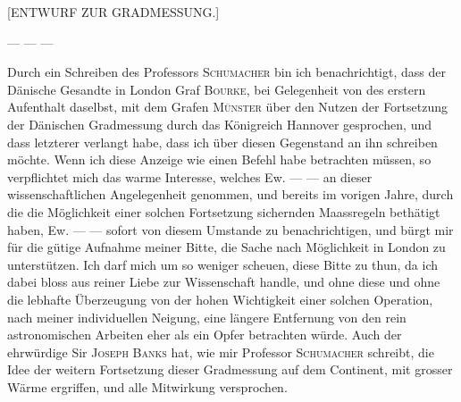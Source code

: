 \par\bigskip
{}%
\begin{center}\large [ENTWURF ZUR GRADMESSUNG.]\end{center}
\par
— — —

Durch ein Schreiben des Professors \textsc{Schumacher} bin ich benachrichtigt, dass der Dänische Gesandte in London Graf \textsc{Bourke}, bei Gelegenheit von des erstern Aufenthalt daselbst, mit dem Grafen \textsc{Münster} über den Nutzen der Fortsetzung der Dänischen Gradmessung durch das Königreich Hannover gesprochen, und dass letzterer verlangt habe, dass ich über diesen Gegenstand an ihn schreiben möchte. Wenn ich diese Anzeige wie einen Befehl habe betrachten müssen, so verpflichtet mich das warme Interesse, welches Ew. — — an dieser wissenschaftlichen Angelegenheit genommen, und bereits im vorigen Jahre, durch die die Möglichkeit einer solchen Fortsetzung sichernden Maassregeln bethätigt haben, Ew. — — sofort von diesem Umstande zu benachrichtigen, und bürgt mir für die gütige Aufnahme meiner Bitte, die Sache nach Möglichkeit in London zu unterstützen. Ich darf mich um so weniger scheuen, diese Bitte zu thun, da ich dabei bloss aus reiner Liebe zur Wissenschaft handle, und ohne diese und ohne die lebhafte Überzeugung von der hohen Wichtigkeit einer solchen Operation, nach meiner individuellen Neigung, eine längere Entfernung von den rein astronomischen Arbeiten eher als ein Opfer betrachten würde. Auch der ehrwürdige Sir \textsc{Joseph Banks} hat, wie mir Professor \textsc{Schumacher} schreibt, die Idee der weitern Fortsetzung dieser Gradmessung auf dem Continent, mit grosser Wärme ergriffen, und alle Mitwirkung versprochen.

